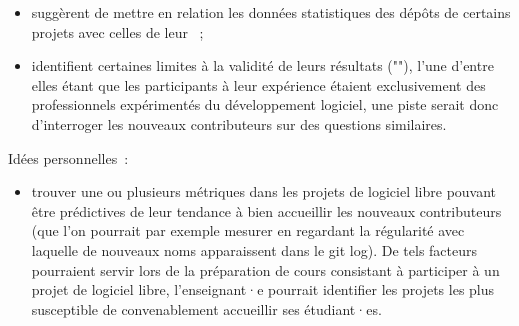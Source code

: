 \begin{itemize}
    \item \textcite[p.~14]{contribution-patterns-2010} suggèrent de mettre en relation les données
        statistiques des \glspl{dépôt} de certains projets avec celles de leur  ;
    \item \textcite[p.~1013]{barriers-2018} identifient certaines limites à la validité de leurs résultats
        (""), l'une d'entre elles étant que les participants à leur expérience
         étaient exclusivement des professionnels expérimentés du développement logiciel, une
        piste serait donc d'interroger les nouveaux contributeurs sur des questions similaires.
\end{itemize}

Idées personnelles :

\begin{itemize}
    \item trouver une ou plusieurs métriques dans les projets de logiciel libre pouvant être prédictives de
        leur tendance à bien accueillir les nouveaux contributeurs (que l'on pourrait par exemple mesurer en
        regardant la régularité avec laquelle de nouveaux noms apparaissent dans le git log). De tels facteurs
        pourraient servir lors de la préparation de cours consistant à participer à un projet de logiciel
        libre, l'enseignant·e pourrait identifier les projets les plus susceptible de convenablement
        accueillir ses étudiant·es.
\end{itemize}
